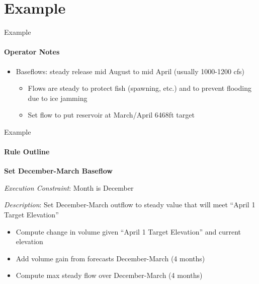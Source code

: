 \documentclass{beamer}
\begin{document}
\section{Example}
\begin{frame}{Example}
\framesubtitle{Operator Notes}
\begin{itemize}
\item Baseflows: steady release mid August to mid April (usually 1000-1200 cfs)
	\begin{itemize}
		\item Flows are steady to protect fish (spawning, etc.) and to prevent flooding due to ice jamming
		\item Set flow to put reservoir at March/April 6468ft target
	\end{itemize}
\end{itemize}
\end{frame}

\begin{frame}{Example}
\framesubtitle{Rule Outline}

\textbf{Set December-March Baseflow}

\textit{Execution Constraint}: Month is December

\textit{Description}: Set December-March outflow to steady value that will meet ``April 1 Target Elevation''

\begin{itemize}
	\item Compute change in volume given ``April 1 Target Elevation'' and current elevation
	\item Add volume gain from forecasts December-March (4 months)
	\item Compute max steady flow over December-March (4 months)
\end{itemize}
\end{frame}
\end{document}
